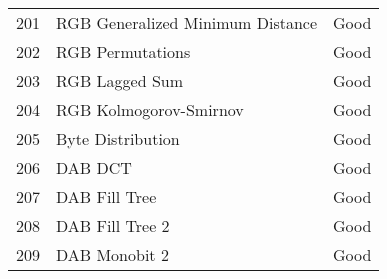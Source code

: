 \begin{table}[tb]
\begin{center}
\begin{tabular}{l | l | l}
201 &       RGB Generalized Minimum Distance  &        Good \\
202 &                       RGB Permutations  &        Good \\
203 &                         RGB Lagged Sum  &        Good \\
204 &            RGB Kolmogorov-Smirnov  &        Good \\
205 &                           Byte Distribution  &        Good \\
206 &                                     DAB DCT  &        Good \\
207 &                          DAB Fill Tree  &        Good \\
208 &                        DAB Fill Tree 2  &        Good \\
209 &                          DAB Monobit 2  &        Good \\
    \hline

    \hline
    \end{tabular}
  \end{center}
\end{table}





